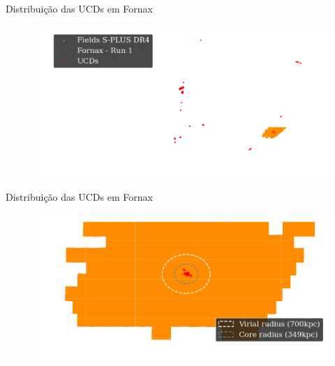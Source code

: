 \begin{frame}[c]{Distribuição das UCDs em Fornax}
    \begin{figure}
        \centering
        \includegraphics[width=0.8\linewidth, keepaspectratio]{images/ucds_sky.png}
    \end{figure}
\end{frame}

\begin{frame}[c]{Distribuição das UCDs em Fornax}
    \begin{figure}
        \centering
        \includegraphics[width=0.8\linewidth, keepaspectratio]{images/zoom_fornax.png}
    \end{figure}
\end{frame}

